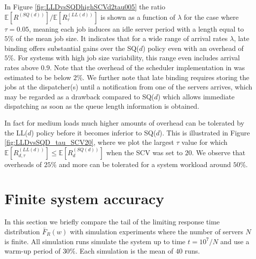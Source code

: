 \documentclass[12pt]{report}
\newcommand{\E}{\mathbb{E}}
\begin{document}
In Figure \ref{fig:LLDvsSQDhighSCVd2tau005} the ratio $\E[R^{(SQ(d))}]/\E[R_{\tau}^{(LL(d))}]$ is shown
as a function of $\lambda$ for the case where $\tau = 0.05$, meaning each job induces an
idle server period with a length equal to $5\%$ of the mean job size.  It indicates that for a wide range of
arrival rates $\lambda$, late binding offers substantial gains over the SQ($d$) policy even with an overhead of 
$5\%$. For systems with high job size variability, this range even includes arrival rates above $0.9$. Note that the overhead of 
the scheduler implementation in \cite{Sparrow} was estimated to be below $2\%$. 
We further note that late binding requires storing the jobs at the dispatcher(s) until a notification from one of the servers arrives,
which may be regarded as a drawback compared to SQ($d$) which allows immediate dispatching as soon as the queue length information
is obtained.

In fact for medium loads much higher amounts of overhead can be tolerated by the LL($d$) policy before it becomes inferior to SQ($d$). This
is illustrated in Figure \ref{fig:LLDvsSQD_tau_SCV20}, where we plot the largest $\tau$ value for which $\E[R_{d,\tau}^{(LL(d))}] \leq \E[R_d^{(SQ(d))}]$
when the SCV was set to $20$.
We observe that overheads of $25\%$ and more can be tolerated for a system workload around $50\%$.   

\section{Finite system accuracy}\label{sec:finite}
In this section we briefly compare the tail of the limiting response time distribution $\bar F_R(w)$ with 
simulation experiments where the number of servers $N$ is finite. All simulation runs simulate the system
up to time $t=10^7/N$ and use a warm-up period of $30\%$. Each simulation is the mean of $40$ runs.
\end{document}
